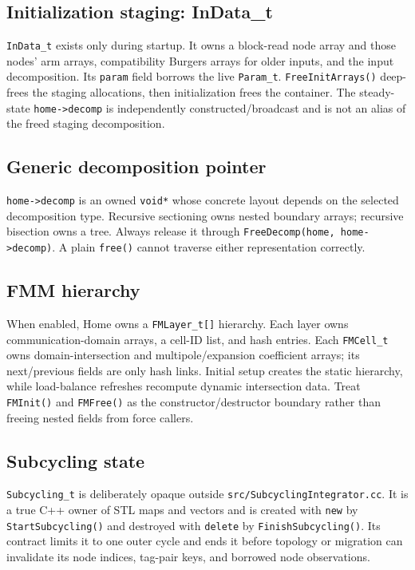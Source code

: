 \documentclass[11pt]{article}
\newcommand{\code}[1]{\texorpdfstring{\nolinkurl{#1}}{#1}}
\newcommand{\srcfile}[1]{\texorpdfstring{\nolinkurl{#1}}{#1}}
\begin{document}
\subsection{Initialization staging: InData\_t}

\code{InData_t} exists only during startup.  It owns a block-read node array
and those nodes' arm arrays, compatibility Burgers arrays for older inputs,
and the input decomposition.  Its \code{param} field borrows the live
\code{Param_t}.  \code{FreeInitArrays()} deep-frees the staging allocations,
then initialization frees the container.  The steady-state
\code{home->decomp} is independently constructed/broadcast and is not an
alias of the freed staging decomposition.

\subsection{Generic decomposition pointer}

\code{home->decomp} is an owned \code{void*} whose concrete layout depends on
the selected decomposition type.  Recursive sectioning owns nested boundary
arrays; recursive bisection owns a tree.  Always release it through
\code{FreeDecomp(home, home->decomp)}.  A plain \code{free()} cannot traverse
either representation correctly.

\subsection{FMM hierarchy}

When enabled, Home owns a \code{FMLayer_t[]} hierarchy.  Each layer owns
communication-domain arrays, a cell-ID list, and hash entries.  Each
\code{FMCell_t} owns domain-intersection and multipole/expansion coefficient
arrays; its next/previous fields are only hash links.  Initial setup creates
the static hierarchy, while load-balance refreshes recompute dynamic
intersection data.  Treat \code{FMInit()} and \code{FMFree()} as the
constructor/destructor boundary rather than freeing nested fields from force
callers.

\subsection{Subcycling state}

\code{Subcycling_t} is deliberately opaque outside
\srcfile{src/SubcyclingIntegrator.cc}.  It is a true C++ owner of STL maps and
vectors and is created with \code{new} by \code{StartSubcycling()} and
destroyed with \code{delete} by \code{FinishSubcycling()}.  Its contract limits
it to one outer cycle and ends it before topology or migration can invalidate
its node indices, tag-pair keys, and borrowed node observations.
\end{document}
